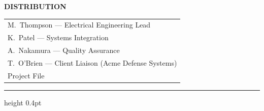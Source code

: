 \documentclass[11pt,letterpaper]{article}
\begin{document}
{\sffamily\small\color{accent}\bfseries DISTRIBUTION}

\vspace{3pt}

\begin{tabularx}{\linewidth}{@{}>{\color{graytext}\faEnvelope[regular]\hspace{6pt}}X@{}}
  M.\ Thompson --- Electrical Engineering Lead \\[1pt]
  K.\ Patel --- Systems Integration \\[1pt]
  A.\ Nakamura --- Quality Assurance \\[1pt]
  T.\ O'Brien --- Client Liaison (Acme Defense Systems) \\[1pt]
  Project File \\
\end{tabularx}

\vspace{6pt}
{\color{lightrule}\hrule height 0.4pt}
\vspace{10pt}










\end{document}
